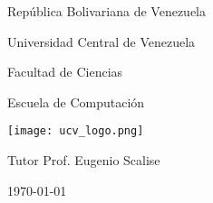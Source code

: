 \begin{titlepage}
	\centering
	{\large República Bolivariana de Venezuela \par}
	{\large Universidad Central de Venezuela\par}
	{\large Facultad de Ciencias\par}
	{\large Escuela de Computación\par}\vspace{2cm}

	\texttt{[image: ucv\_logo.png]}\par\vspace{1cm}
	{\scshape\Large\textbf{\@title}\par}
	\vfill

	{\large Tutor Prof. Eugenio Scalise \par}
	{\large \@author \par}
	{\large \mydate\today \par}
\end{titlepage}